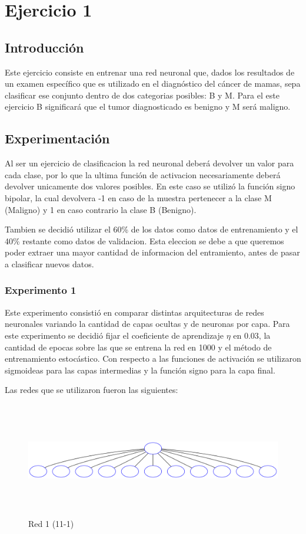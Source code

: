 \section{Ejercicio 1}

\subsection{Introducción}
Este ejercicio consiste en entrenar una red neuronal que, dados los resultados de un examen específico que es utilizado en el diagnóstico del
cáncer de mamas, sepa clasificar ese conjunto dentro de dos categorias posibles: B y M. Para el este ejercicio B significará que el tumor diagnosticado
es benigno y M será maligno.

\subsection{Experimentación}
Al ser un ejercicio de clasificacion la red neuronal deberá devolver un valor para cada clase, por lo que la ultima función de activacion necesariamente
deberá devolver unicamente dos valores posibles. En este caso se utilizó la función signo bipolar, la cual devolvera -1 en caso de la muestra pertenecer
a la clase M (Maligno) y 1 en caso contrario la clase B (Benigno).

Tambien se decidió utilizar el 60\% de los datos como datos de entrenamiento y el 40\% restante como datos de validacion. Esta eleccion se debe a que
queremos poder extraer una mayor cantidad de informacion del entramiento, antes de pasar a clasificar nuevos datos.

\subsubsection{Experimento 1}
Este experimento consistió en comparar distintas arquitecturas de redes neuronales variando la cantidad de capas ocultas y de neuronas por capa.
Para este experimento se decidió fijar el coeficiente de aprendizaje $\eta$ en 0.03, la cantidad de epocas sobre las que se entrena la red en 1000 y el
método de entrenamiento estocástico. Con respecto a las funciones de activación se utilizaron sigmoideas para las capas intermedias y la función signo
para la capa final.

Las redes que se utilizaron fueron las siguientes:

\begin{figure}[H]
  \includegraphics[width=12cm, height=5cm]{../plot/11-1.png}
  \centering
  \caption{Red 1 (11-1)}
\end{figure}

